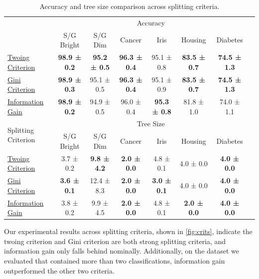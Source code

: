 \documentclass[10pt]{article} %
\begin{document}
\begin{table}[h]
	\centering
    \caption{Accuracy and tree size comparison across splitting criteria.}
	\small
	\begin{tabular}{lccccccc} 
		\addlinespace
		\toprule
		\multirow{2}{*}{Splitting Criterion} & \multicolumn{6}{c}{Accuracy}  \\ 
		\cmidrule(lr){2-7}  
		\multirow{1}{*}{} & \multirow{1}{*}{S/G Bright} & \multirow{1}{*}{S/G Dim} & \multirow{1}{*}{Cancer} & \multirow{1}{*}{Iris} & \multirow{1}{*}{Housing} & \multirow{1}{*}{Diabetes} \\ 
		\midrule
		\hyperref[twoing]{Twoing Criterion} & \textbf{98.9 ± 0.2} & \textbf{95.2 ± 0.5} & \textbf{96.3 ± 0.4} & 95.1 ± 0.8 & \textbf{83.5 ± 0.7} & \textbf{74.5 ± 1.3} \\

		\hyperref[gini]{Gini Criterion} & \textbf{98.9 ± 0.3} & 95.1 ± 0.5 & \textbf{96.3 ± 0.4} & 95.1 ± 0.9 & \textbf{83.5 ± 0.7} & \textbf{74.5 ± 1.3} \\

		\hyperref[IG]{Information Gain}& \textbf{98.9 ± 0.2} & 94.9 ± 0.5 & 96.0 ± 0.4 & \textbf{95.3 ± 0.8} & 81.8 ± 1.0 & 74.0 ± 1.1 \\

		\midrule
		\multirow{2}{*}{Splitting Criterion} & \multicolumn{6}{c}{Tree Size}  \\ 
		\cmidrule(lr){2-7}  
		& S/G Bright & S/G Dim & Cancer & Iris & Housing & Diabetes \\ 
		\midrule


		\hyperref[twoing] {Twoing Criterion} & 3.7 ± 0.2 & \textbf{9.8 ± 4.2} & \textbf{2.0 ± 0.0} & 4.8 ± 0.1 & 4.0 ± 0.0 & \textbf{4.0 ± 0.0} \\ 
			\hyperref[gini]{Gini Criterion}	& \textbf{3.6 ± 0.1} & 12.4 ± 8.3 & \textbf{2.0 ± 0.0} & \textbf{3.0 ± 0.1} & 4.0 ± 0.0 & \textbf{4.0 ± 0.0} \\
		\hyperref[IG]{Information Gain} & 3.8 ± 0.2 & 9.9 ± 4.5 & \textbf{2.0 ± 0.0} & 4.8 ± 0.1 & \textbf{2.0 ± 0.0} & \textbf{4.0 ± 0.0} \\ 

    \bottomrule
	\end{tabular}
	\label{fig:crits}
\end{table}

Our experimental results across splitting criteria, shown in \autoref{fig:crits}, indicate the twoing criterion and Gini criterion are both strong splitting criteria, and information gain only falls behind nominally. Additionally, on the dataset we evaluated that contained more than two classifications, information gain outperformed the other two criteria.
\end{document}
